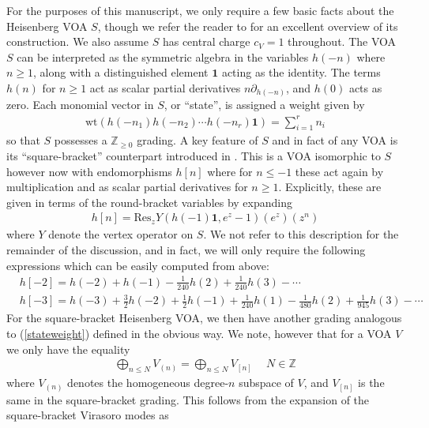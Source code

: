 \documentclass[10pt,a4paper]{amsart}
\numberwithin{equation}{section}
\theoremstyle{definition}
\newcommand{\Heis}{S}
\begin{document}
For the purposes of this manuscript, we only require a few basic facts about the Heisenberg VOA $\Heis$, though we refer the reader to \cite{LL} for an excellent overview of its construction. We also assume $\Heis$ has central charge $c_{V} = 1$ throughout. The VOA $\Heis$ can be interpreted as the symmetric algebra in the variables $h(-n)$ where $n \geq 1$, along with a distinguished element $\textbf{1}$ acting as the identity. The terms $h(n)$ for $n \geq 1$ act as scalar partial derivatives $n \partial_{h(-n)}$, and $h(0)$ acts as zero. Each monomial vector in $\Heis$, or ``state'', is assigned a weight given by
\begin{align}
    \text{wt}(h(-n_{1}) h(-n_{2}) \cdots h(-n_{r})\textbf{1}) = \sum_{i=1}^{r} n_{i} \label{stateweight}
\end{align}
so that $\Heis$ possesses a $\mathbb{Z}_{\geq 0}$ grading. A key feature of $\Heis$ and in fact of any VOA is its ``square-bracket'' counterpart introduced in \cite{Zhu}. This is a VOA isomorphic to $\Heis$ however now with endomorphisms $h[n]$ where for $n \leq -1$ these act again by multiplication and as scalar partial derivatives for $n \geq 1$. Explicitly, these are given in terms of the round-bracket variables by expanding
\begin{align*}
    h[n] = \text{Res}_{z} Y(h(-1)\textbf{1},e^{z}-1)(e^{z})(z^{n})
\end{align*}
where $Y$ denote the vertex operator on $\Heis$. We not refer to this description for the remainder of the discussion, and in fact, we will only require the following expressions which can be easily computed from above:
\begin{align}
    &h[-2] = h(-2) + h(-1) - \frac{1}{240}h(2) + \frac{1}{240}h(3) - \cdots \label{squareh2exp} \\
    &h[-3] = h(-3) + \frac{3}{2}h(-2) + \frac{1}{2}h(-1) + \frac{1}{240}h(1) -\frac{1}{480}h(2) + \frac{1}{945}h(3) - \cdots \label{squareh3exp}
\end{align}
For the square-bracket Heisenberg VOA, we then have another grading analogous to (\ref{stateweight}) defined in the obvious way. We note, however that for a VOA $V$ we only have the equality
\begin{align*}
    \bigoplus_{n \leq N} V_{(n)} = \bigoplus_{n \leq N} V_{[n]} \hspace{15pt} N \in \mathbb{Z}
\end{align*}
where $V_{(n)}$ denotes the homogeneous degree-$n$ subspace of $V$, and $V_{[n]}$ is the same in the square-bracket grading. This follows from the expansion of the square-bracket Virasoro modes as
\end{document}
